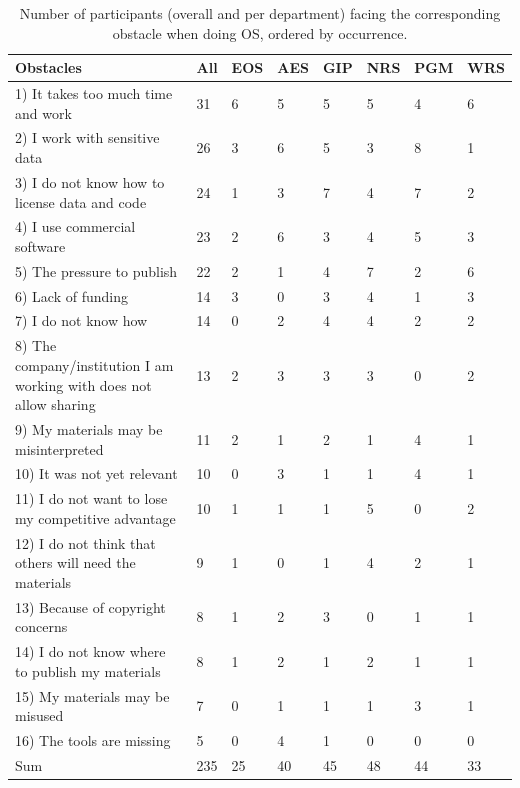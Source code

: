 \documentclass[gc, manuscript]{copernicus}
\begin{document}
\begin{table}
\caption{Number of participants (overall and per department) facing the corresponding obstacle when doing OS, ordered by occurrence.}
\begin{tabular}{p{9cm} | p{0.6cm} | p{0.6cm} | p{0.6cm} | p{0.6cm} | p{0.6cm} | p{0.6cm} | p{0.6cm}} 
\textbf{Obstacles} & \textbf{All} & \textbf{EOS} & \textbf{AES} & \textbf{GIP} & \textbf{NRS} & \textbf{PGM} & \textbf{WRS} \\
\hline
1) It takes too much time and work & 31 & 6 & 5 & 5 & 5 & 4 & 6 \\
\hline
2) I work with sensitive data & 26 & 3 & 6 & 5 & 3 & 8 & 1 \\
\hline
3) I do not know how to license data and code & 24 & 1 & 3 & 7 & 4 & 7 & 2 \\
\hline
4) I use commercial software & 23 & 2 & 6 & 3 & 4 & 5 & 3 \\
\hline
5) The pressure to publish & 22 & 2 & 1 & 4 & 7 & 2 & 6 \\
\hline
6) Lack of funding & 14 & 3 & 0 & 3 & 4 & 1 & 3 \\
\hline
7) I do not know how & 14 & 0 & 2 & 4 & 4 & 2 & 2 \\
\hline
8) The company/institution I am working with does not allow sharing & 13 & 2 & 3 & 3 & 3 & 0 & 2 \\
\hline
9) My materials may be misinterpreted & 11 & 2 & 1 & 2 & 1 & 4 & 1 \\
\hline
10) It was not yet relevant & 10 & 0 & 3 & 1 & 1 & 4 & 1 \\
\hline
11) I do not want to lose my competitive advantage & 10 & 1 & 1 & 1 & 5 & 0 & 2 \\
\hline
12) I do not think that others will need the materials & 9 & 1 & 0 & 1 & 4 & 2 & 1 \\
\hline
13) Because of copyright concerns & 8 & 1 & 2 & 3 & 0 & 1 & 1 \\
\hline
14) I do not know where to publish my materials & 8 & 1 & 2 & 1 & 2 & 1 & 1 \\
\hline
15) My materials may be misused & 7 & 0 & 1 & 1 & 1 & 3 & 1 \\
\hline
16) The tools are missing & 5 & 0 & 4 & 1 & 0 & 0 & 0 \\
\hline
Sum & 235 & 25 & 40 & 45 & 48 & 44 & 33 \\
\hline
\end{tabular}
\label{table:1}
\end{table}
\end{document}
